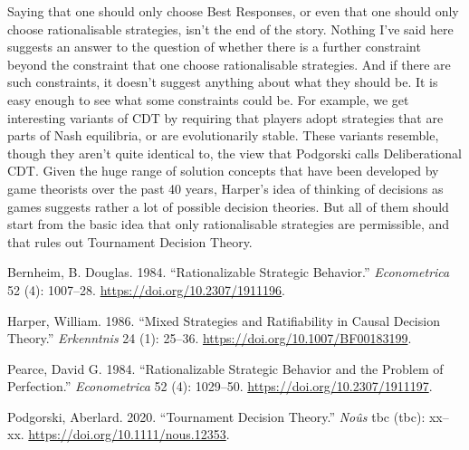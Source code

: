 \documentclass[11pt,]{article}
\begin{document}
Saying that one should only choose Best Responses, or even that one should only choose rationalisable strategies, isn't the end of the story. Nothing I've said here suggests an answer to the question of whether there is a further constraint beyond the constraint that one choose rationalisable strategies. And if there are such constraints, it doesn't suggest anything about what they should be. It is easy enough to see what some constraints could be. For example, we get interesting variants of CDT by requiring that players adopt strategies that are parts of Nash equilibria, or are evolutionarily stable. These variants resemble, though they aren't quite identical to, the view that Podgorski calls Deliberational CDT. Given the huge range of solution concepts that have been developed by game theorists over the past 40 years, Harper's idea of thinking of decisions as games suggests rather a lot of possible decision theories. But all of them should start from the basic idea that only rationalisable strategies are permissible, and that rules out Tournament Decision Theory.

\hypertarget{refs}{}
\leavevmode\hypertarget{ref-Bernheim1984}{}%
Bernheim, B. Douglas. 1984. ``Rationalizable Strategic Behavior.'' \emph{Econometrica} 52 (4): 1007--28. \url{https://doi.org/10.2307/1911196}.

\leavevmode\hypertarget{ref-Harper1986}{}%
Harper, William. 1986. ``Mixed Strategies and Ratifiability in Causal Decision Theory.'' \emph{Erkenntnis} 24 (1): 25--36. \url{https://doi.org/10.1007/BF00183199}.

\leavevmode\hypertarget{ref-Pearce1984}{}%
Pearce, David G. 1984. ``Rationalizable Strategic Behavior and the Problem of Perfection.'' \emph{Econometrica} 52 (4): 1029--50. \url{https://doi.org/10.2307/1911197}.

\leavevmode\hypertarget{ref-Podgorski2020}{}%
Podgorski, Aberlard. 2020. ``Tournament Decision Theory.'' \emph{Noûs} tbc (tbc): xx--xx. \url{https://doi.org/10.1111/nous.12353}.
\end{document}
